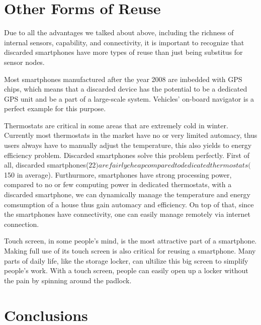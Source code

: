 \section{Other Forms of Reuse}
\label{sec-other}

Due to all the advantages we talked about above, including the richness of internal sensors, capability, and connectivity, it is important to recognize that discarded smartphones have more types of reuse than just being substitus for sensor nodes.


Most smartphones manufactured after the year 2008 are imbedded with GPS chips, which means that a discarded device has the potential to be a dedicated GPS unit and be a part of  a large-scale system. Vehicles' on-board navigator is a perfect example for this purpose. 


Thermostats are critical in some areas that are extremely cold in winter. Currently most thermostats in the market have no or very limited automacy, thus users always have to manually adjust the temperature, this also yields to energy efficiency problem.  Discarded smartphones solve this problem perfectly. First of all, discarded smartphones($22) are fairly cheap compared to dedicated thermostats($150 in average). Furthurmore, smartphones have strong processing power, compared to no or few computing power in dedicated thermostats, with a discarded smartphone, we can dynamically manage the temperature and energy comsumption of a house thus gain automacy and efficiency. On top of that, since the smartphones have connectivity, one can easily manage remotely via internet connection. 


Touch screen, in some people's mind, is the most attractive part of a smartphone. Making full use of its touch screen is also critical for reusing a smartphone. Many parts of daily life, like the storage locker, can ultilize this big screen to simplify people's work. With a touch screen, people can easily open up a locker without the pain by spinning around the padlock. 

\section{Conclusions}
\label{sec-conclusion}
